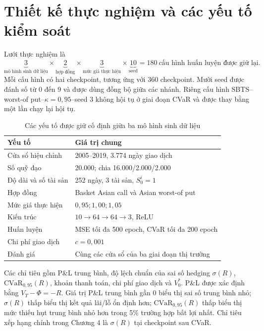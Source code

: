 \section{Thiết kế thực nghiệm và các yếu tố kiểm soát}
\label{sec:c3-experiment}

Lưới thực nghiệm là
\begin{equation}
    \underbrace{3}_{\text{mô hình sinh dữ liệu}}
    \times\underbrace{2}_{\text{hợp đồng}}
    \times\underbrace{3}_{\text{mức giá thực hiện}}
    \times\underbrace{10}_{\text{seed}}
    =180\ \text{cấu hình huấn luyện được giữ lại}.
    \label{eq:c3-grid}
\end{equation}
Mỗi cấu hình có hai checkpoint, tương ứng với 360 checkpoint. Mười seed được
đánh số từ 0 đến 9 và được dùng đồng bộ giữa các nhánh. Riêng cấu hình
SBTS--worst-of put--$\kappa=0{,}95$--seed 3 không hội tụ ở giai đoạn CVaR và
được thay bằng một lần chạy lại hội tụ.

\begin{table}[H]
\centering
\small
\caption{Các yếu tố được giữ cố định giữa ba mô hình sinh dữ liệu}
\label{tab:c3-fairness}
\begin{tabularx}{\textwidth}{@{}lX@{}}
\toprule
\textbf{Yếu tố} & \textbf{Giá trị chung}\\
\midrule
Cửa sổ hiệu chỉnh & 2005--2019, 3.774 ngày giao dịch\\
Số quỹ đạo & 20.000; chia 16.000/2.000/2.000\\
Độ dài và số tài sản & 252 ngày, 3 tài sản, $S_0^i=1$\\
Hợp đồng & Basket Asian call và Asian worst-of put\\
Mức giá thực hiện & $0{,}95;1{,}00;1{,}05$\\
Kiến trúc & $10\to64\to64\to3$, ReLU\\
Huấn luyện & MSE tối đa 500 epoch, CVaR tối đa 200 epoch\\
Chi phí giao dịch & $c=0{,}001$\\
Đánh giá & Cùng các cửa sổ của ba giai đoạn thị trường\\
\bottomrule
\end{tabularx}
\end{table}

Các chỉ tiêu gồm P\&L trung bình, độ lệch chuẩn của sai số hedging
$\sigma(R)$, $\mathrm{CVaR}_{0{,}95}(R)$, khoản thanh toán, chi phí giao dịch và
$V_0^{*}$. P\&L được xác định bằng $V_T-\Phi=-R$. Giá trị P\&L trung bình gần
0 biểu thị sai số trung bình nhỏ; $\sigma(R)$ thấp biểu thị kết quả lãi/lỗ ổn
định hơn; $\mathrm{CVaR}_{0{,}95}(R)$ thấp biểu thị mức thiếu hụt trung bình nhỏ
hơn trong 5\% trường hợp bất lợi nhất. Chỉ tiêu xếp hạng chính trong Chương 4
là $\sigma(R)$ tại checkpoint sau CVaR.

